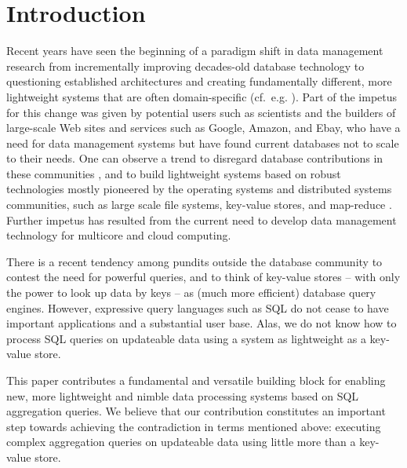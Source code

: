 \section{Introduction}


Recent years have seen the beginning of a paradigm shift in data management
research from incrementally
improving decades-old database technology
%
%
to questioning established
architectures and creating fundamentally different, more lightweight systems
that are often domain-specific
(cf.\ e.g. \cite{DBLP:conf/vldb/StonebrakerMAHHH07,DBLP:journals/pvldb/KallmanKNPRZJMSZHA08}).
Part of the impetus for this change was given by 
potential users such as scientists and the builders of
large-scale Web sites and services such as Google, Amazon, and Ebay,
who have a need for data management systems but have found current databases
not to scale to their needs.
One can observe a trend to disregard database contributions
in these communities \cite{dbcolumn, DBLP:conf/sigmod/PavloPRADMS09}, and to build lightweight systems based on
robust technologies mostly pioneered by the operating systems and distributed
systems communities, such as large scale file systems, key-value stores, and
map-reduce
\cite{DBLP:journals/cacm/DeanG08, DBLP:journals/tocs/ChangDGHWBCFG08}.
Further impetus has resulted from the current need to develop data management
technology for multicore and cloud computing.
%

There is a recent tendency among pundits outside the database community to
contest the need for powerful queries, and to
think of key-value stores -- with only the power to look up data by
keys -- as (much more efficient) database query engines.
%
%
However, expressive query languages such as SQL do not cease to have
important applications and a substantial user base.
Alas, we do not know how to process SQL queries on updateable data
using a system as lightweight as a key-value store.

This paper contributes a fundamental and versatile building block for
enabling new, more lightweight and nimble data processing systems based
on SQL aggregation que\-ries. We believe that our contribution
constitutes an important
step towards achieving the contradiction in terms mentioned
above: executing complex aggregation queries on updateable data
using little more than a key-value store.

